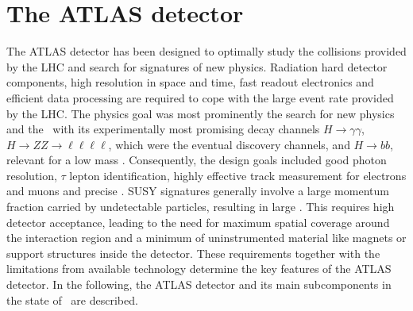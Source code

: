 \section{The ATLAS detector}
%
The \gls{ATLAS} detector has been designed to optimally study the collisions provided by the \gls{LHC} and search for signatures of new physics. 
Radiation hard detector components, high resolution in space and time, fast readout electronics and efficient data processing are required to cope with the large event rate provided by the \gls{LHC}. 
The physics goal was most prominently the search for new physics and the \Hboson\ with its experimentally most promising decay channels $H\rightarrow \gamma\gamma$, $H \rightarrow ZZ \rightarrow \ell\ell\ell\ell$, which were the eventual discovery channels, and $H \rightarrow bb$, relevant for a low mass \Hboson. Consequently, the design goals included good photon resolution, $\tau$ lepton identification, highly effective track measurement for electrons and muons and precise \btag. \gls{SUSY} signatures generally involve a large momentum fraction carried by undetectable particles, resulting in large \met. This requires high detector acceptance, leading to the need for maximum spatial coverage around the interaction region and a minimum of uninstrumented material like magnets or support structures inside the detector. 
%
%
These requirements together with the limitations from available technology determine the key features of the \gls{ATLAS} detector. In the following, the \gls{ATLAS} detector and its main subcomponents in the state of \RunOne\ are described.


